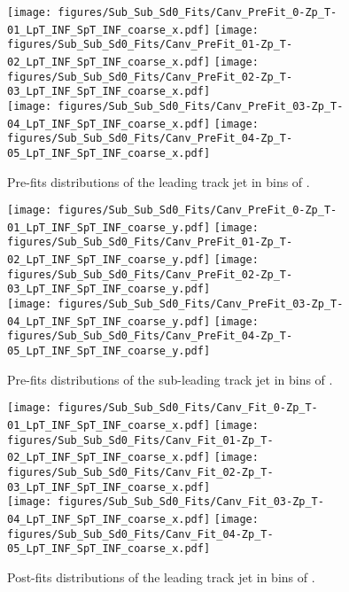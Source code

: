 \begin{figure}[htbp]
  \centering
 \texttt{[image: figures/Sub\_Sub\_Sd0\_Fits/Canv\_PreFit\_0-Zp\_T-01\_LpT\_INF\_SpT\_INF\_coarse\_x.pdf]}
 \texttt{[image: figures/Sub\_Sub\_Sd0\_Fits/Canv\_PreFit\_01-Zp\_T-02\_LpT\_INF\_SpT\_INF\_coarse\_x.pdf]}
 \texttt{[image: figures/Sub\_Sub\_Sd0\_Fits/Canv\_PreFit\_02-Zp\_T-03\_LpT\_INF\_SpT\_INF\_coarse\_x.pdf]}\\
 \texttt{[image: figures/Sub\_Sub\_Sd0\_Fits/Canv\_PreFit\_03-Zp\_T-04\_LpT\_INF\_SpT\_INF\_coarse\_x.pdf]}
 \texttt{[image: figures/Sub\_Sub\_Sd0\_Fits/Canv\_PreFit\_04-Zp\_T-05\_LpT\_INF\_SpT\_INF\_coarse\_x.pdf]}

\caption{Pre-fits \subsdzero distributions of the leading track jet in bins of \zpt. }
  \label{fig:ZpT-prefits-leading-subsub}
\end{figure}


\begin{figure}[htbp]
  \centering
 \texttt{[image: figures/Sub\_Sub\_Sd0\_Fits/Canv\_PreFit\_0-Zp\_T-01\_LpT\_INF\_SpT\_INF\_coarse\_y.pdf]}
 \texttt{[image: figures/Sub\_Sub\_Sd0\_Fits/Canv\_PreFit\_01-Zp\_T-02\_LpT\_INF\_SpT\_INF\_coarse\_y.pdf]}
 \texttt{[image: figures/Sub\_Sub\_Sd0\_Fits/Canv\_PreFit\_02-Zp\_T-03\_LpT\_INF\_SpT\_INF\_coarse\_y.pdf]}\\
 \texttt{[image: figures/Sub\_Sub\_Sd0\_Fits/Canv\_PreFit\_03-Zp\_T-04\_LpT\_INF\_SpT\_INF\_coarse\_y.pdf]}
 \texttt{[image: figures/Sub\_Sub\_Sd0\_Fits/Canv\_PreFit\_04-Zp\_T-05\_LpT\_INF\_SpT\_INF\_coarse\_y.pdf]}

\caption{Pre-fits \subsdzero distributions of the sub-leading track jet in bins of \zpt. }
  \label{fig:ZpT-prefits-subleading-subsub}
\end{figure}

\begin{figure}[htbp]
  \centering
 \texttt{[image: figures/Sub\_Sub\_Sd0\_Fits/Canv\_Fit\_0-Zp\_T-01\_LpT\_INF\_SpT\_INF\_coarse\_x.pdf]}
 \texttt{[image: figures/Sub\_Sub\_Sd0\_Fits/Canv\_Fit\_01-Zp\_T-02\_LpT\_INF\_SpT\_INF\_coarse\_x.pdf]}
 \texttt{[image: figures/Sub\_Sub\_Sd0\_Fits/Canv\_Fit\_02-Zp\_T-03\_LpT\_INF\_SpT\_INF\_coarse\_x.pdf]}\\
 \texttt{[image: figures/Sub\_Sub\_Sd0\_Fits/Canv\_Fit\_03-Zp\_T-04\_LpT\_INF\_SpT\_INF\_coarse\_x.pdf]}
 \texttt{[image: figures/Sub\_Sub\_Sd0\_Fits/Canv\_Fit\_04-Zp\_T-05\_LpT\_INF\_SpT\_INF\_coarse\_x.pdf]}


\caption{Post-fits \subsdzero distributions of the leading track jet in bins of \zpt. }
  \label{fig:ZpT-postfits-leading-subsub}
\end{figure}


